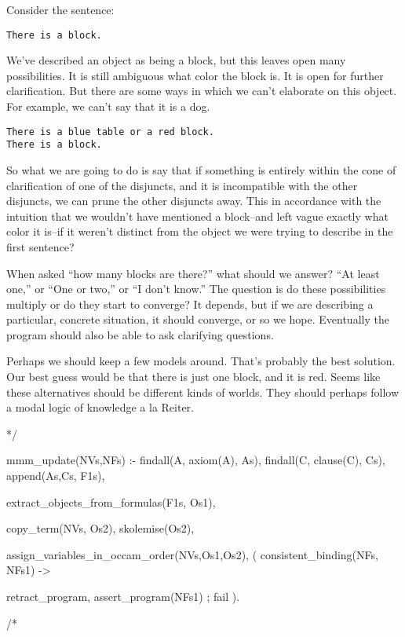 \documentclass{book}[9pt]
\newenvironment{code}%
{\small \verbatim}%
{\endverbatim \large}
\begin{document}
Consider the sentence:
\begin{verbatim}
There is a block.
\end{verbatim}

\noindent We've described an object as being a block, but this leaves
open many possibilities.  It is still ambiguous what color the block
is.  It is open for further clarification.  But there are some ways in
which we can't elaborate on this object.  For example, we can't say
that it is a dog.

\begin{verbatim}
There is a blue table or a red block.
There is a block.
\end{verbatim}
\noindent So what we are going to do is say that if something is
entirely within the cone of clarification of one of the disjuncts, and
it is incompatible with the other disjuncts, we can prune the other
disjuncts away.  This in accordance with the intuition that we
wouldn't have mentioned a block--and left vague exactly what color it
is--if it weren't distinct from the object we were trying to describe
in the first sentence?

 When asked ``how many blocks are there?''  what should we answer?
 ``At least one,'' or ``One or two,'' or ``I don't know.''  The
 question is do these possibilities multiply or do they start to
 converge?  It depends, but if we are describing a particular,
 concrete situation, it should converge, or so we hope.  Eventually
 the program should also be able to ask clarifying questions.

Perhaps we should keep a few models around.  That's probably the best
solution.  Our best guess would be that there is just one block, and
it is red.  Seems like these alternatives should be different kinds of
worlds.  They should perhaps follow a modal logic of knowledge a la
Reiter.



\begin{code}
*/

mmm_update(NVs,NFs) :-
	findall(A, axiom(A), As),
	findall(C, clause(C), Cs),
	append(As,Cs, F1s),
	
	extract_objects_from_formulas(F1s, Os1),
	
	copy_term(NVs, Os2),
	skolemise(Os2),
	
	assign_variables_in_occam_order(NVs,Os1,Os2),
	( consistent_binding(NFs, NFs1)
        -> %
	
	   retract_program,
	   assert_program(NFs1)
         ;
           fail
         ).

/*
\end{code}
\end{document}
